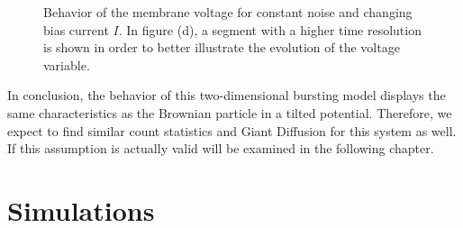 \documentclass[12pt,a4paper]{article}
\begin{document}
\begin{figure}[H]
 	\caption{Behavior of the membrane voltage for constant noise and changing bias current $I$. In figure (d), a segment with a higher time resolution is shown in order to better illustrate the evolution of the voltage variable.}
 	\label{currentnoise} 
 \end{figure}
In conclusion, the behavior of this two-dimensional bursting model displays the same characteristics as the Brownian particle in a tilted potential. Therefore, we expect to find similar count statistics and Giant Diffusion for this system as well. If this assumption is actually valid will be examined in the following chapter.

\section{Simulations}
\end{document}
